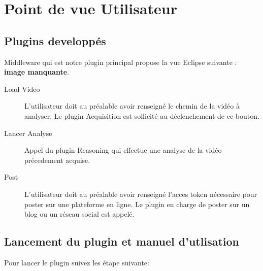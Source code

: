 \chapter{Point de vue Utilisateur}

\section{Plugins developpés}
Middleware qui est notre plugin principal propose la vue Eclipse suivante : \textbf{image manquante}. 
\begin{description}
\item[Load Video]
L'utilisateur doit au préalable avoir renseigné le chemin de la vidéo à analyser. Le plugin Acquisition est sollicité au déclenchement de ce bouton. 
\item[Lancer Analyse]
Appel du plugin Reasoning qui effectue une analyse de la vidéo précedement acquise.
\item[Post]
L'utilisateur doit au préalable avoir renseigné l'acces token nécessaire pour poster sur une plateforme en ligne. 
Le plugin en charge de poster sur un blog ou un réseau social est appelé.
\end{description}
 
\section{Lancement du plugin et manuel d'utlisation}

Pour lancer le plugin suivez les étape suivante:

